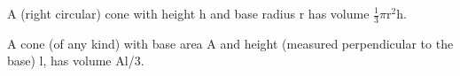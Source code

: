 A (right circular) cone with height h and base radius r has volume
$ \frac{1}{3} \pi \mathrm{r}^2 \mathrm{h} . $
\par
A cone (of any kind) with base area A and height (measured perpendicular to the
base) l, has volume Al/3.